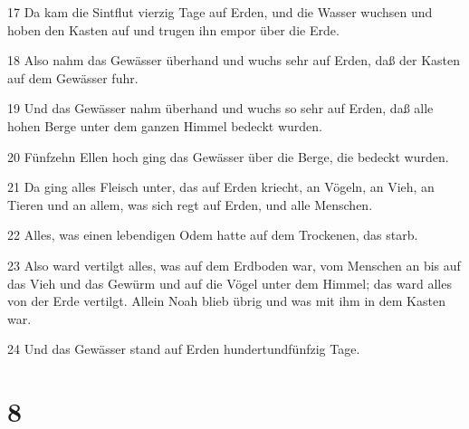 \par 17 Da kam die Sintflut vierzig Tage auf Erden, und die Wasser wuchsen und hoben den Kasten auf und trugen ihn empor über die Erde.
\par 18 Also nahm das Gewässer überhand und wuchs sehr auf Erden, daß der Kasten auf dem Gewässer fuhr.
\par 19 Und das Gewässer nahm überhand und wuchs so sehr auf Erden, daß alle hohen Berge unter dem ganzen Himmel bedeckt wurden.
\par 20 Fünfzehn Ellen hoch ging das Gewässer über die Berge, die bedeckt wurden.
\par 21 Da ging alles Fleisch unter, das auf Erden kriecht, an Vögeln, an Vieh, an Tieren und an allem, was sich regt auf Erden, und alle Menschen.
\par 22 Alles, was einen lebendigen Odem hatte auf dem Trockenen, das starb.
\par 23 Also ward vertilgt alles, was auf dem Erdboden war, vom Menschen an bis auf das Vieh und das Gewürm und auf die Vögel unter dem Himmel; das ward alles von der Erde vertilgt. Allein Noah blieb übrig und was mit ihm in dem Kasten war.
\par 24 Und das Gewässer stand auf Erden hundertundfünfzig Tage.

\chapter{8}

